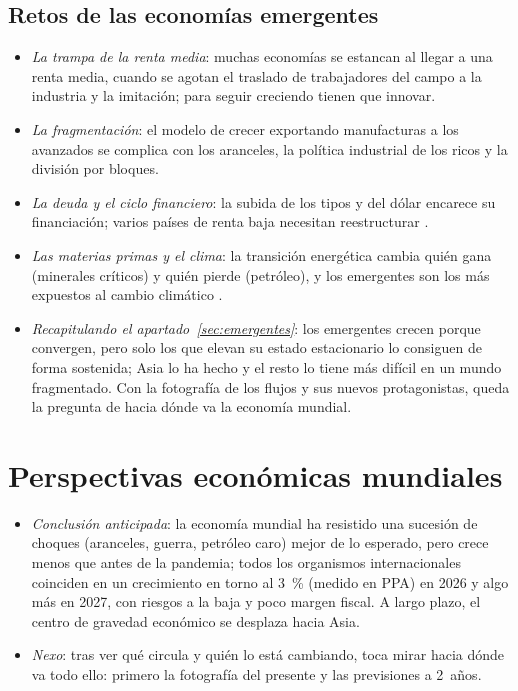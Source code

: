 \documentclass[11pt]{article}
\begin{document}
\subsection{Retos de las economías emergentes}\label{sec:retos}

\begin{itemize}
\item \emph{La trampa de la renta media}: muchas economías se estancan al llegar a una renta media, cuando se agotan el traslado de trabajadores del campo a la industria y la imitación; para seguir creciendo tienen que innovar\nocite{GillKharas2007East,BM2024WDR}.
\item \emph{La fragmentación}: el modelo de crecer exportando manufacturas a los avanzados se complica con los aranceles, la política industrial de los ricos y la división por bloques.
\item \emph{La deuda y el ciclo financiero}: la subida de los tipos y del dólar encarece su financiación; varios países de renta baja necesitan reestructurar .
\item \emph{Las materias primas y el clima}: la transición energética cambia quién gana (minerales críticos) y quién pierde (petróleo), y los emergentes son los más expuestos al cambio climático .
\item \emph{Recapitulando el apartado~\ref{sec:emergentes}}: los emergentes crecen porque convergen, pero solo los que elevan su estado estacionario lo consiguen de forma sostenida; Asia lo ha hecho y el resto lo tiene más difícil en un mundo fragmentado. Con la fotografía de los flujos y sus nuevos protagonistas, queda la pregunta de hacia dónde va la economía mundial.
\end{itemize}

\section{Perspectivas económicas mundiales}\label{sec:perspectivas}

\begin{itemize}
\item \emph{Conclusión anticipada}: la economía mundial ha resistido una sucesión de choques (aranceles, guerra, petróleo caro) mejor de lo esperado, pero crece menos que antes de la pandemia; todos los organismos internacionales coinciden en un crecimiento en torno al 3~\% (medido en PPA) en 2026 y algo más en 2027, con riesgos a la baja y poco margen fiscal\nocite{FMI2026WEO,OCDE2026Interim,CE2026Otono}. A largo plazo, el centro de gravedad económico se desplaza hacia Asia.
\item \emph{Nexo}: tras ver qué circula y quién lo está cambiando, toca mirar hacia dónde va todo ello: primero la fotografía del presente y las previsiones a 2~años.
\end{itemize}
\end{document}
